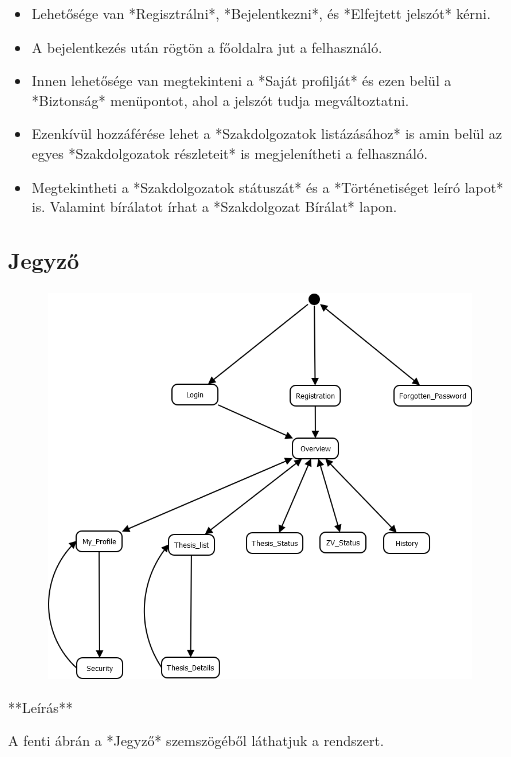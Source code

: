 \documentclass[a4paper,12pt]{article}
\begin{document}
\begin{itemize}
	\item Lehetősége van *Regisztrálni*, *Bejelentkezni*, és *Elfejtett jelszót* kérni. 
	\item A bejelentkezés után rögtön a főoldalra jut a felhasználó. 
	\item Innen lehetősége van megtekinteni a *Saját profilját* és ezen belül a *Biztonság* menüpontot, ahol a jelszót tudja megváltoztatni. 
	\item Ezenkívül hozzáférése lehet a *Szakdolgozatok listázásához* is amin belül az egyes *Szakdolgozatok részleteit* is megjelenítheti a felhasználó. 
	\item Megtekintheti a *Szakdolgozatok státuszát* és a *Történetiséget leíró lapot* is. Valamint bírálatot írhat a *Szakdolgozat Bírálat* lapon. 
\end{itemize}

\subsection{Jegyző}

\begin{figure}
	\centering
	\includegraphics[width=\textwidth]{images/Lapok_kozotti_atmenetek/Jegyzo.png}
	\caption{}
	\label{fig:Jegyzo}
\end{figure}

**Leírás**

A fenti ábrán a *Jegyző* szemszögéből láthatjuk a rendszert. 
\end{document}
